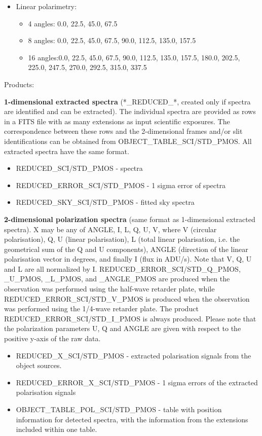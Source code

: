 \begin{itemize}
\item Linear polarimetry:
\begin{itemize}
\item 4 angles: 0.0, 22.5, 45.0, 67.5
\item 8 angles: 0.0, 22.5, 45.0, 67.5, 90.0, 112.5, 135.0, 157.5
\item 16 angles:0.0, 22.5, 45.0, 67.5, 90.0, 112.5, 135.0, 157.5, 180.0, 202.5, 225.0, 247.5, 270.0, 292.5, 315.0, 337.5
\end{itemize}
\end{itemize}

Products:

{\bf 1-dimensional extracted spectra} (*\_REDUCED\_*, created only if spectra are identified and can be extracted).
The individual spectra are provided as rows in a FITS file with as many extensions as input scientific exposures. The correspondence between these rows and the 2-dimensional frames and/or slit identifications
can be obtained from OBJECT\_TABLE\_SCI/STD\_PMOS. All extracted spectra have the same format.
\begin{itemize}
\item REDUCED\_SCI/STD\_PMOS - spectra
\item REDUCED\_ERROR\_SCI/STD\_PMOS - 1 sigma error of spectra
\item REDUCED\_SKY\_SCI/STD\_PMOS - fitted sky spectra
\end{itemize}

{\bf 2-dimensional polarization spectra} (same format as 1-dimensional extracted spectra).
X may be any of ANGLE, I, L, Q, U, V, where V (circular polarisation), Q, U (linear polarisation), L (total linear polarisation, i.e. the
geometrical sum of the Q and U components), ANGLE (direction of the linear polarisation vector in degrees, and finally I (flux in ADU/s). Note that V, Q, U and L are all normalized by I. REDUCED\_ERROR\_SCI/STD\_Q\_PMOS, \_U\_PMOS, \_L\_PMOS, and \_ANGLE\_PMOS are produced when the observation was performed using the half-wave retarder plate, while REDUCED\_ERROR\_SCI/STD\_V\_PMOS is produced when the observation was performed using the 1/4-wave retarder plate. The product REDUCED\_ERROR\_SCI/STD\_I\_PMOS is always produced.
Please note that the polarization parameters U, Q and ANGLE are given with respect to the positive y-axis of the raw data.
\begin{itemize}
\item REDUCED\_X\_SCI/STD\_PMOS - extracted polarisation signals from the object sources.
\item REDUCED\_ERROR\_X\_SCI/STD\_PMOS - 1 sigma errors of the extracted polarisation signals
\item OBJECT\_TABLE\_POL\_SCI/STD\_PMOS - table with position information for detected spectra, with the information from the extensions included within one table.
\end{itemize}

